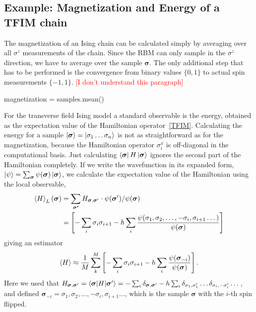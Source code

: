 \documentclass[submission, Phys]{SciPost}
\begin{document}
\subsection{Example: Magnetization and Energy of a TFIM chain}

The magnetization of an Ising chain can be calculated simply by averaging over all $\sigma^z$ measurements of the chain.
Since the RBM can only sample in the $\sigma^z$ direction, we have to average over the sample $\bm{\sigma}$. The only additional step that has to be performed is the convergence from binary values $\{0,1 \}$ to actual spin measurements $\{-1 ,1 \}$. \textcolor{red}{[I don't understand this paragraph]}

\begin{python}
	magnetization = samples.mean()
\end{python}


For the transverse field Ising model a standard observable is the energy, obtained as the expectation value of
the Hamiltonian operator~\ref{TFIM}.
Calculating the energy for a sample $\ket{\bm{\sigma} }= \ket{\sigma_1 \dots \sigma_n}$ is not as straightforward as for the magnetization,
because the Hamiltonian operator ${\sigma}^x_i$ is off-diagonal in the computational basis.
Just calculating $\bra{\bm{\sigma} } H \ket{\bm{\sigma} }$ ignores the second part of the Hamiltonian completely.
If we write the wavefunction in its expanded form, $\ket{\psi} = \sum_{\bm{\sigma}} \psi(\bm{\sigma}) \ket{\bm{\sigma}} $,
we calculate the expectation value of the Hamiltonian using the local observable,
\begin{align}
	\braket{ H}_L({\bm{\sigma}}) & = \sum_{ \bm{\sigma'}} H_{\bm{\sigma}, \bm{\sigma}'} \cdot \psi(\bm{\sigma}') / \psi(\bm{\sigma})                                                     \\
	                             & =  \left[ -\sum_i \sigma_i \sigma_{i+1} - h \sum_i \frac{\psi(\sigma_1, \sigma_2, \dots , -\sigma_i, \sigma_{i+1} \dots)}{\psi (\bm{\sigma})} \right]
\end{align}
giving an estimator
\begin{equation}
	\braket{ H} \approx \frac{1}{M} \sum_k^M \left[ -\sum_i \sigma_i \sigma_{i+1} - h \sum_i \frac{\psi (\bm{\sigma}_{-i})}{\psi (\bm{\sigma})} \right].
\end{equation}
Here we used that $H_{\bm{\sigma}, \bm{\sigma}'} = \braket{\bm{\sigma} | H | \bm{\sigma}'} = -\sum_i \delta_{\bm{\sigma}, \bm{\sigma}'} - h \sum_i \delta_{\sigma_1, \sigma_1'} \dots \delta_{\sigma_i, -\sigma_i'} \dots$, and defined $\bm{\sigma}_{-i} = \sigma_1, \sigma_2, \dots , -\sigma_i, \sigma_{i+1} \dots$, which is the sample $\bm{\sigma}$ with the $i$-th spin flipped.
\end{document}
